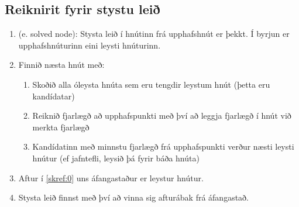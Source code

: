 \subsection{Reiknirit fyrir stystu leið}
\begin{enumerate}[label=Skref \arabic{*}]
\item {} (e. solved node):  Stysta leið í hnútinn frá upphafs\-hnút er þekkt. Í byrjun er upphafshnúturinn eini leysti hnúturinn.
\item \label{skref:0} Finnið næsta hnút með:
\begin{enumerate}[label=(\roman{*})]
\item\label{skref1} Skoðið alla óleysta hnúta sem eru tengdir leystum hnút
  (þetta eru kandídatar)
\item\label{skref2} Reiknið fjarlægð að upphafspunkti með því að leggja
fjarlægð í hnút við merkta fjarlægð
\item\label{skref3} Kandídatinn með minnstu fjarlægð frá upphafspunkti verður næsti leysti hnútur (ef jafntefli, leysið þá fyrir báða hnúta)
\end{enumerate}
\item Aftur í \ref{skref:0} uns áfangastaður er leystur hnútur.
\item Stysta leið finnst með því að vinna sig afturábak frá áfangastað.
\end{enumerate}

